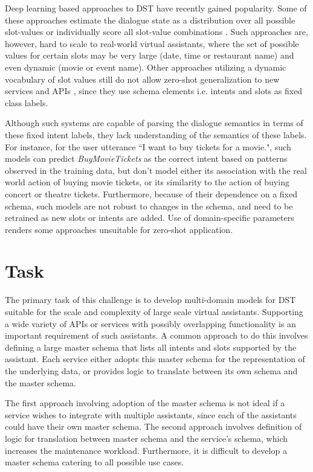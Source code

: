 Deep learning based approaches to DST have recently gained popularity. Some of these approaches estimate the dialogue state as a distribution over all possible slot-values \cite{henderson2014,wen2017network}  or individually score all slot-value combinations \cite{mrkvsic2017neural,zhong-etal-2018-global}. Such approaches are, however, hard to scale to real-world virtual assistants, where the set of possible values for certain slots may be very large (date, time or restaurant name) and even dynamic (movie or event name). Other approaches utilizing a dynamic vocabulary of slot values \cite{rastogi2018multi,goel2019hyst} still do not allow zero-shot generalization to new services and APIs \cite{wu-etal-2019-transferable}, since they use schema elements i.e. intents and slots as fixed class labels.

Although such systems are capable of parsing the dialogue semantics in terms of these fixed intent labels, they lack understanding of the semantics of these labels. For instance, for the user utterance ``I want to buy tickets for a movie.", such models can predict \textit{BuyMovieTickets} as the correct intent based on patterns observed in the training data, but don't model either its association with the real world action of buying movie tickets, or its similarity to the action of buying concert or theatre tickets. Furthermore, because of their dependence on a fixed schema, such models are not robust to changes in the schema, and need to be retrained as new slots or intents are added. Use of domain-specific parameters renders some approaches unsuitable for zero-shot application.

\section{Task}

The primary task of this challenge is to develop multi-domain models for DST suitable for the scale and complexity of large scale virtual assistants. Supporting a wide variety of APIs or services with possibly overlapping functionality is an important requirement of such assistants. A common approach to do this involves defining a large master schema that lists all intents and slots supported by the assistant. Each service either adopts this master schema for the representation of the underlying data, or provides logic to translate between its own schema and the master schema. 

The first approach involving adoption of the master schema is not ideal if a service wishes to integrate with multiple assistants, since each of the assistants could have their own master schema. The second approach involves definition of logic for translation between master schema and the service's schema, which increases the maintenance workload. Furthermore, it is difficult to develop a master schema catering to all possible use cases.


